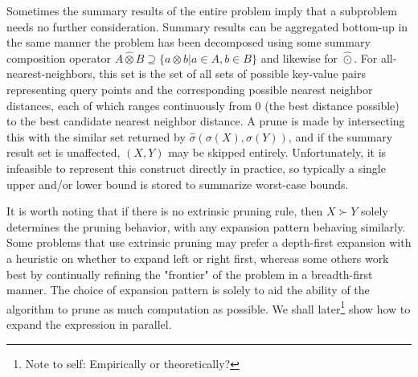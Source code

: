 \documentclass[times, leqno,twocolumn]{article}
\newcommand{\authornote}[1]{\footnote{Note to self: #1}}
\newcommand{\authorsnote}[1]{\authornote{#1}}
\newcommand{\otimeshat}{\widehat{\otimes}}
\newcommand{\odothat}{\widehat{\odot}}
\newcommand{\prefsplit}[2]{#1 \succ #2}
\newcommand{\summary}{\hat{\sigma}}
\newcommand{\gnp}{\psi_{\Theta}}
\newcommand{\kdroot}[1]{#1^{\text{root}}}
\newcommand{\outstat}{\sigma}
\begin{document}
Sometimes the summary results of the entire problem imply that a subproblem needs no further consideration.
Summary results can be aggregated bottom-up in the same manner the problem has been decomposed using some summary composition operator $A \otimeshat B \supseteq \{a \otimes b | a \in A, b \in B\}$ and likewise for $\odothat$.
For all-nearest-neighbors, this set is the set of all sets of possible key-value pairs representing query points and the corresponding possible nearest neighbor distances, each of which ranges continuously from 0 (the best distance possible) to the best candidate nearest neighbor distance.
A prune is made by intersecting this with the similar set returned by $\summary(\outstat(X),\outstat(Y))$, and if the summary result set is unaffected, $(X,Y)$ may be skipped entirely.
Unfortunately, it is infeasible to represent this construct directly in practice, so typically a single upper and/or lower bound is stored to summarize worst-case bounds.

It is worth noting that if there is no extrinsic pruning rule, then $\prefsplit{X}{Y}$ solely determines the pruning behavior, with any expansion pattern behaving similarly.
Some problems that use extrinsic pruning may prefer a depth-first expansion with a heuristic on whether to expand left or right first, whereas some others work best by continually refining the "frontier" of the problem in a breadth-first manner.
The choice of expansion pattern is solely to aid the ability of the algorithm to prune as much computation as possible.
We shall later\authorsnote{Empirically or theoretically?} show how to expand the expression in parallel.


\end{document}
